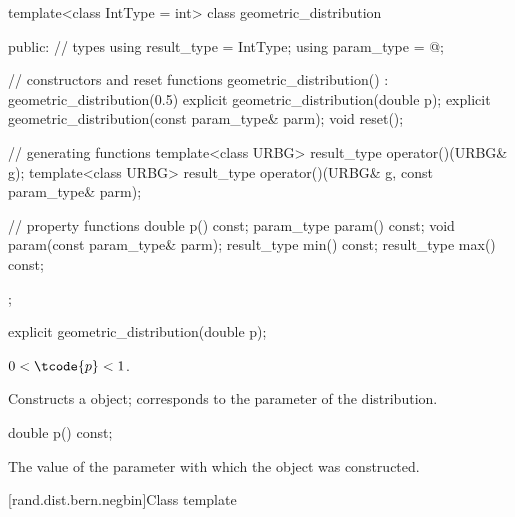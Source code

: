 %
\begin{codeblock}
template<class IntType = int>
  class geometric_distribution {
  public:
    // types
    using result_type = IntType;
    using param_type  = @\unspec@;

    // constructors and reset functions
    geometric_distribution() : geometric_distribution(0.5) {}
    explicit geometric_distribution(double p);
    explicit geometric_distribution(const param_type& parm);
    void reset();

    // generating functions
    template<class URBG>
      result_type operator()(URBG& g);
    template<class URBG>
      result_type operator()(URBG& g, const param_type& parm);

    // property functions
    double p() const;
    param_type param() const;
    void param(const param_type& parm);
    result_type min() const;
    result_type max() const;
  };
\end{codeblock}


%
\begin{itemdecl}
explicit geometric_distribution(double p);
\end{itemdecl}

\begin{itemdescr}
\pnum\requires
 $0 < \tcode{p} < 1$.

\pnum\effects Constructs a  object;
 corresponds to the parameter of the distribution.
\end{itemdescr}

%
\begin{itemdecl}
double p() const;
\end{itemdecl}

\begin{itemdescr}
\pnum\returns The value of the  parameter
 with which the object was constructed.
\end{itemdescr}


[rand.dist.bern.negbin]{Class template }
%
%

